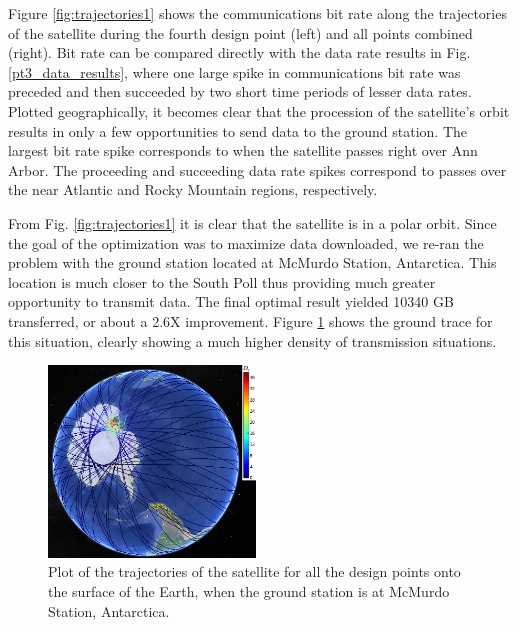 \documentclass[]{aiaa-tc} %
\begin{document}
        Figure \ref{fig:trajectories1} shows the communications bit rate along the trajectories of the
        satellite during the fourth design point (left) and all points combined (right).
        Bit rate can be compared directly with the data rate results in
        Fig. \ref{pt3_data_results}, where one large spike in communications
        bit rate was preceded and then succeeded by two short time periods of lesser
        data rates. Plotted geographically, it becomes clear that the procession of
        the satellite's orbit results in only a few opportunities to send data to the ground station.
        The largest bit rate spike corresponds to when the satellite passes right over Ann Arbor.
        The proceeding and succeeding data rate spikes correspond to passes over the near Atlantic and
        Rocky Mountain regions, respectively.



        From Fig. \ref{fig:trajectories1} it is clear that the satellite is in a polar orbit. Since the
        goal of the optimization was to maximize data downloaded, we re-ran the problem with the ground
        station located at McMurdo Station, Antarctica. This location is much closer to the South Poll
        thus providing much greater opportunity to transmit data. The final optimal result yielded 10340 GB
        transferred, or about a 2.6X improvement. Figure \ref{fig:trajectories2} shows the ground trace
        for this situation, clearly showing a much higher density of transmission situations.

        \begin{figure}[!htb]
            \centering
            \includegraphics[width=0.49\textwidth]{images/allpts_gearth_mcmurdo}
            \caption{Plot of the trajectories of the satellite
            for all the design points onto the surface of the Earth, when the ground
            station is at McMurdo Station, Antarctica.
            \label{fig:trajectories2}
            }
        \end{figure}
\end{document}

